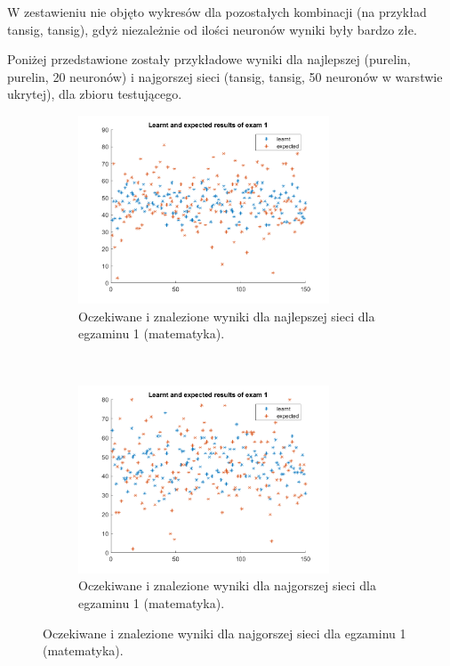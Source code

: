 \documentclass[12pt]{article}
\begin{document}
W zestawieniu nie objęto wykresów dla pozostałych kombinacji (na przykład tansig, tansig),  gdyż niezależnie od ilości neuronów wyniki były bardzo złe.

\vspace{0.5cm}

Poniżej przedstawione zostały przykładowe wyniki dla najlepszej (purelin, purelin, 20 neuronów) i najgorszej sieci (tansig, tansig, 50 neuronów w warstwie ukrytej), dla zbioru testującego.

\begin{figure}[H]
\begin{subfigure}[t]{0.48\textwidth} 
\centering
\includegraphics[height=2.2in]{best_results_1.png}
\caption{Oczekiwane i znalezione wyniki dla najlepszej sieci dla egzaminu 1 (matematyka).}
\end{subfigure}
~~
\begin{subfigure}[t]{0.48\textwidth} 
\centering
\includegraphics[height=2.2in]{worst_exam_1.png}
\caption{Oczekiwane i znalezione wyniki dla najgorszej sieci dla egzaminu 1 (matematyka).}
\end{subfigure}


\end{figure}
\end{document}
